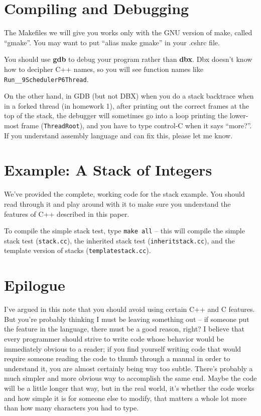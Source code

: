 \section{Compiling and Debugging}

The Makefiles we will give you works only with the GNU version of
make, called ``gmake''.  You may want
to put ``alias make gmake'' in your .cshrc file.

You should use {\bf gdb} to debug your program rather than {\bf dbx}.
Dbx doesn't know how to decipher C++ names, so you will see function
names like \verb+Run__9SchedulerP6Thread+.

On the other hand, in GDB (but not DBX) when you do a stack backtrace
when in a forked thread (in homework 1), after printing out the
correct frames at the top of the stack, the debugger will sometimes
go into a loop printing the lower-most frame ({\tt ThreadRoot}), and 
you have to type control-C when it says ``more?''.  If you understand
assembly language and can fix this, please let me know.

\section{Example: A Stack of Integers}

We've provided the complete, working code for the stack example.  You should
read through it and play around with it to make sure you understand
the features of C++ described in this paper.

To compile the simple stack test, type {\tt make all} --
this will compile the simple stack test ({\tt stack.cc}), 
the inherited stack test ({\tt inheritstack.cc}), and
the template version of stacks ({\tt templatestack.cc}).

\section{Epilogue}

I've argued in this note that you should avoid using certain C++ 
and C features.  But you're probably thinking I must be leaving 
something out -- if someone put the
feature in the language, there must be a good reason, right?  I believe that
every programmer should strive to write code whose behavior would be
immediately obvious to a reader;
if you find yourself writing code that would require someone reading the code
to thumb through a manual in order to understand it, you are almost certainly
being way too subtle.  There's probably a much simpler and more obvious
way to accomplish the same end.  Maybe the code will be a little longer
that way,
but in the real world, it's whether the code works and how simple it is for
someone else to modify, that matters a whole lot more than how many
characters you had to type.


